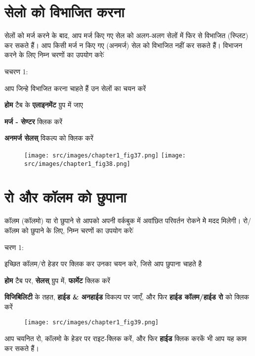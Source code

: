 \section{सेलो को विभाजित करना}\label{id-1.18}

सेलों को मर्ज करने के बाद, आप मर्ज किए गए सेल को अलग-अलग सेलों में फिर से विभाजित (स्प्लिट) कर सकते हैं। आप किसी मर्ज न किए गए (अनमर्ज) सेल को विभाजित नहीं कर सकते हैं। विभाजन करने के लिए निम्न चरणों का उपयोग करेःं

\begin{descriptionSimple}{चचरण 1:}
\item[चचरण 1] आप जिन्हे विभाजित करना चाहते हैं उन सेलों का चयन करें
\item[चचरण 2] \textbf{होम} टैब के \textbf{एलाइनमेंट} ग्रुप में जाए
\item[चचरण 3] \textbf{मर्ज - सेण्टर} क्लिक करें
\item[चचरण 4] \textbf{अनमर्ज सेलस्} विकल्प को क्लिक करें
\end{descriptionSimple}
\begin{figure}[H]
\texttt{[image: src/images/chapter1\_fig37.png]}\qquad
\texttt{[image: src/images/chapter1\_fig38.png]}
\end{figure}					

\section{रो और कॉलम को छुपाना}\label{id-1.19}

कॉलम (कॉलमो) या रो छुपाने से आपको अपनी वर्कबुक में अवांछित परिवर्तन रोकने मेे मदद मिलेगी। रो/कॉलम को छुपाने के लिए, निम्न चरणों का उपयोग करेःं

\begin{descriptionSimple}{चरण 1:}
\item[चरण 1] इच्छित कॉलम/रो हेडर पर क्लिक कर उनका चयन करे, जिसे आप छुपाना चाहते है
\item[चरण 2] \textbf{होम} टैब पर, \textbf{सेलस्} ग्रुप में, \textbf{फार्मेट} क्लिक करें
\item[चरण 3] \textbf{विजिबिलिटी} के तहत, \textbf{हाईड \& अनहाईड} विकल्प पर जाएँ, और फिर \textbf{हाईड कॉलम/हाईड रो} को क्लिक करें
\end{descriptionSimple}
\begin{figure}[H]
\centering
\texttt{[image: src/images/chapter1\_fig39.png]}
\end{figure}				

आप चयनित रो, कॉलमो के हेडर पर राइट-क्लिक करें, और फिर \textbf{हाईड} क्लिक करकें भी आप यह काम कर सकते हैं।

